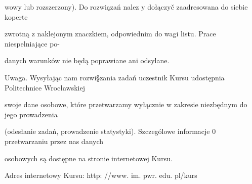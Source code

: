 \documentclass[a4paper,12pt]{article}
\begin{document}
wowy lub rozszerzony). Do rozwiązań nalez $\mathrm{y}$ dołączyč zaadresowana do siebie koperte

zwrotną $\mathrm{z}$ naklejonym znaczkiem, odpowiednim do wagi listu. Prace niespelniające po-

danych warunków nie będą poprawiane ani odsylane.

Uwaga. Wysyłając nam rozwi\S zania zadań uczestnik Kursu udostępnia Politechnice Wrocławskiej

swoje dane osobowe, które przetwarzamy wyłącznie $\mathrm{w}$ zakresie niezbędnym do jego prowadzenia

(odesłanie zadań, prowadzenie statystyki). Szczególowe informacje $0$ przetwarzaniu przez nas danych

osobowych są dostępne na stronie internetowej Kursu.

Adres internetowy Kursu: http: //www. im. pwr. edu. pl/kurs
\end{document}
